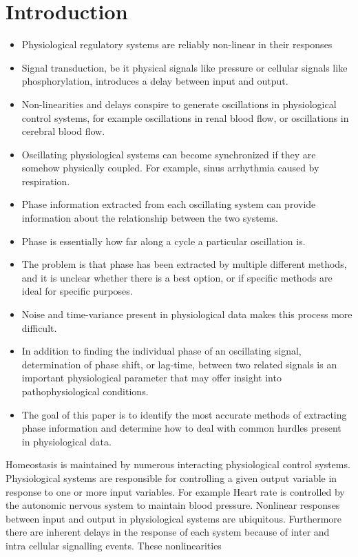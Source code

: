 \documentclass{article}
\begin{document}
\section*{Introduction}
\begin{itemize}
\item Physiological regulatory systems are reliably non-linear in their responses
\item Signal transduction, be it physical signals like pressure or cellular signals like phosphorylation, introduces a delay between input and output. 
\item Non-linearities and delays conspire to generate oscillations in physiological control systems, for example oscillations in renal blood flow, or oscillations in cerebral blood flow.
\item Oscillating physiological systems can become synchronized if they are somehow physically coupled. For example, sinus arrhythmia caused by respiration. 
\item Phase information extracted from each oscillating system can provide information about the relationship between the two systems.
\item Phase is essentially how far along a cycle a particular oscillation is. 
\item The problem is that phase has been extracted by multiple different methods, and it is unclear whether there is a best option, or if specific methods are ideal for specific purposes.
\item Noise and time-variance present in physiological data makes this process more difficult.

\item In addition to finding the individual phase of an oscillating signal, determination of phase shift, or lag-time, between two related signals is an important physiological parameter that may offer insight into pathophysiological conditions.  
\item The goal of this paper is to identify the most accurate methods of extracting phase information and determine how to deal with common hurdles present in physiological data.
\end{itemize}

Homeostasis is maintained by numerous interacting physiological control systems. Physiological systems are responsible for controlling a given output variable in response to one or more input variables. For example Heart rate is controlled by the autonomic nervous system to maintain blood pressure. Nonlinear responses between input and output in physiological systems are ubiquitous. Furthermore there are inherent delays in the response of each system because of inter and intra cellular signalling events. These nonlinearities
\end{document}
